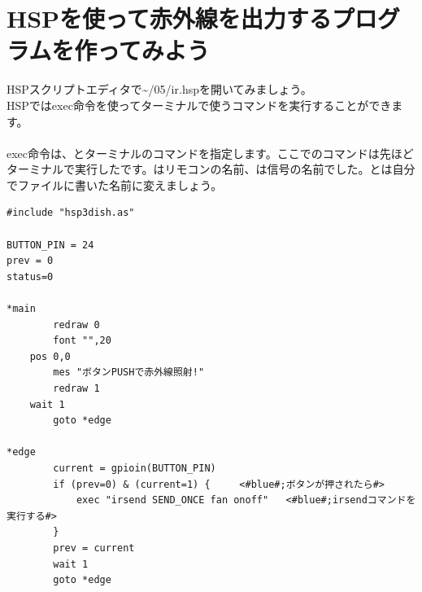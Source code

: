 \documentclass[text05.tex]{subfiles}
\begin{document}
\newpage
\section{HSPを使って赤外線を出力するプログラムを作ってみよう}
HSPスクリプトエディタで\textasciitilde /05/ir.hspを開いてみましょう。\\
HSPではexec命令を使ってターミナルで使うコマンドを実行することができます。\\
\\
exec命令は、とターミナルのコマンドを指定します。ここでのコマンドは先ほどターミナルで実行したです。\code{\textcolor{red}{fan}}はリモコンの名前、\code{\textcolor{red}{onoff}}は信号の名前でした。\code{\textcolor{red}{fan}}と\code{\textcolor{red}{onoff}}は自分でファイルに書いた名前に変えましょう。\\

\begin{lstlisting}[caption=ir.hsp,label=ir.hsp]
#include "hsp3dish.as"

BUTTON_PIN = 24
prev = 0
status=0

*main
        redraw 0 
        font "",20
	pos 0,0
        mes "ボタンPUSHで赤外線照射!"
        redraw 1
	wait 1
        goto *edge

*edge
        current = gpioin(BUTTON_PIN)
        if (prev=0) & (current=1) {		<#blue#;ボタンが押されたら#>
            exec "irsend SEND_ONCE fan onoff"	<#blue#;irsendコマンドを実行する#>
        }
        prev = current
        wait 1
        goto *edge
\end{lstlisting}

\begin{tcolorbox}[title=\useOmetoi]
\begin{enumerate}
\end{enumerate}
\end{tcolorbox}
\end{document}
